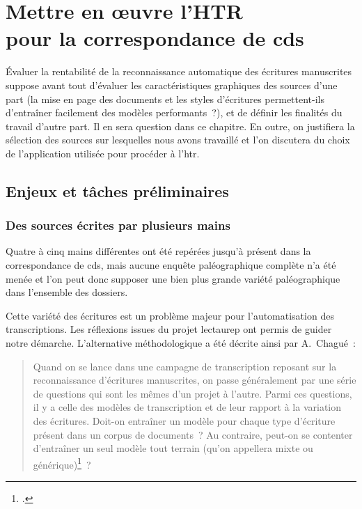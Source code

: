 \documentclass[a4paper,12pt,twoside]{book}
\begin{document}
	\pagestyle{empty}
	\cleardoublepage
	\pagestyle{plain}			
	
	\chapter[HTR~: mise en œuvre]{Mettre en œuvre l'HTR \\ \large pour la correspondance de \gls{cds}}
		\label{chap2}
		
		Évaluer la rentabilité de la reconnaissance automatique des écritures manuscrites suppose avant tout d'évaluer les caractéristiques graphiques des sources d'une part (la mise en page des documents et les styles d'écritures permettent-ils d'entraîner facilement des modèles performants~?), et de définir les finalités du travail d'autre part. Il en sera question dans ce chapitre. En outre, on justifiera la sélection des sources sur lesquelles nous avons travaillé et l'on discutera du choix de l'application utilisée pour procéder à l'\gls{htr}.
	
		\section{Enjeux et tâches préliminaires}
			
			\subsection{Des sources écrites par plusieurs mains}
				Quatre à cinq mains différentes ont été repérées jusqu'à présent dans la correspondance de \gls{cds}, mais aucune enquête paléographique complète n'a été menée et l'on peut donc supposer une bien plus grande variété paléographique dans l'ensemble des dossiers.
				
				Cette variété des écritures est un problème majeur pour l'automatisation des transcriptions. Les réflexions issues du projet \gls{lectaurep} ont permis de guider notre démarche. L'alternative méthodologique a été décrite ainsi par A.~Chagué~:
				
				\begin{quotation}
					Quand on se lance dans une campagne de transcription reposant sur la reconnaissance d’écritures manuscrites, on passe généralement par une série de questions qui sont les mêmes d’un projet à l’autre. Parmi ces questions, il y a celle des modèles de transcription et de leur rapport à la variation des écritures. Doit-on entraîner un modèle pour chaque type d’écriture présent dans un corpus de documents~? Au contraire, peut-on se contenter d’entraîner un seul modèle tout terrain (qu’on appellera mixte ou générique)\footcite{chagueCreationModelesTranscription}~?
				\end{quotation}
			
\end{document}
